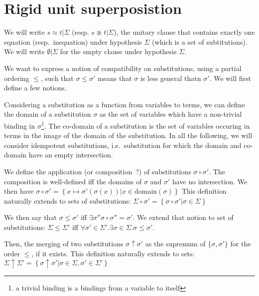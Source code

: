 
\section{Rigid unit superposistion}

\EnableBpAbbreviations{}

We will write $s \approx t | \Sigma$ (resp. $s \not\approx t | \Sigma$),
the unitary clause that contains exactly one equation (resp.~inequation)
under hypothesis $\Sigma$ (which is a set of subtitutions).
We will write $\emptyset | \Sigma$ for the empty clause under hypothesis $\Sigma$.

We want to express a notion of compatibility on substitutions, using a
partial ordering $\leq$, such that $\sigma \leq \sigma'$ means that $\sigma$ is
less general thatn $\sigma'$. We will first define a few notions.


Considering a substitution as a function from variables to terms, we can define
the domain of a substitution $\sigma$ as the set of variables which have a non-trivial
binding in $\sigma$\footnote{a trivial binding is a bindings from a variable to itself}.
The co-domain of a substitution is the set of variables occuring in terms in the image of
the domain of the substitution.
In all the following, we will consider idempotent substitutions, i.e.~substitution for which
the domain and co-domain have an empty intersection.


We define the application (or composition~?) of substitutions $\sigma \circ \sigma'$.
The composition is well-defined iff the domains of $\sigma$ and $\sigma'$ have no
intersection. We then have
$\sigma \circ \sigma' = \left\{ x \mapsto \sigma'(\sigma(x)) | x \in \text{domain}(\sigma) \right\}$
This definition naturally extends to sets of substitutions:
$\Sigma \circ \sigma' = \left\{ \sigma \circ \sigma' | \sigma \in \Sigma \right\}$


We then say that $\sigma \leq \sigma'$ iff $\exists \sigma'' \sigma \circ \sigma'' = \sigma'$.
We extend that notion to set of substitutions:
$\Sigma \leq \Sigma'$ iff $\forall \sigma' \in \Sigma'. \exists \sigma \in \Sigma. \sigma \leq \sigma'$.

Then, the merging of two substitutions $\sigma \uparrow \sigma'$ as the supremum of $\{\sigma,\sigma'\}$
for the order $\leq$, if it exists. This definition naturally extends to sets:
$\Sigma \uparrow \Sigma' = \left\{ \sigma \uparrow \sigma' | \sigma \in \Sigma, \sigma' \in \Sigma' \right\}$


